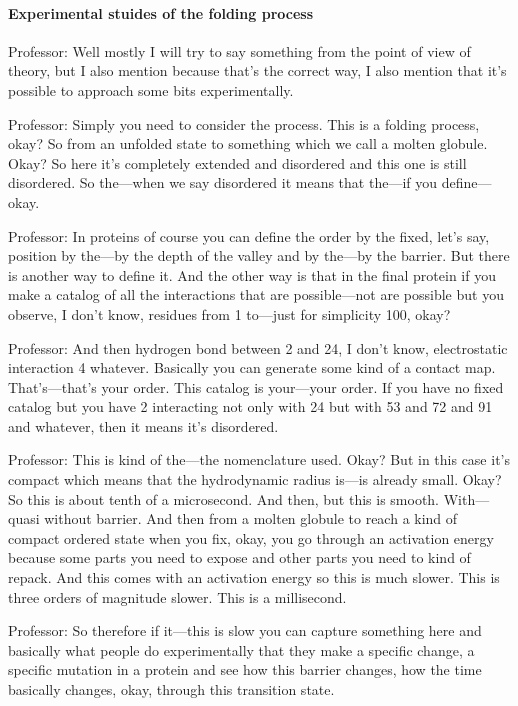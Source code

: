 \paragraph{Experimental stuides of the folding process}
Professor: Well mostly I will try to say something from the point of view of theory, but I also mention because that’s the correct way, I also mention that it’s possible to approach some bits experimentally.

Professor: Simply you need to consider the process. This is a folding process, okay? So from an unfolded state to something which we call a molten globule. Okay? So here it’s completely extended and disordered and this one is still disordered. So the—when we say disordered it means that the—if you define—okay.

Professor: In proteins of course you can define the order by the fixed, let’s say, position by the—by the depth of the valley and by the—by the barrier. But there is another way to define it. And the other way is that in the final protein if you make a catalog of all the interactions that are possible—not are possible but you observe, I don’t know, residues from 1 to—just for simplicity 100, okay?

Professor: And then hydrogen bond between 2 and 24, I don’t know, electrostatic interaction 4 whatever. Basically you can generate some kind of a contact map. That’s—that’s your order. This catalog is your—your order. If you have no fixed catalog but you have 2 interacting not only with 24 but with 53 and 72 and 91 and whatever, then it means it’s disordered.

Professor: This is kind of the—the nomenclature used. Okay? But in this case it’s compact which means that the hydrodynamic radius is—is already small. Okay? So this is about tenth of a microsecond. And then, but this is smooth. With—quasi without barrier. And then from a molten globule to reach a kind of compact ordered state when you fix, okay, you go through an activation energy because some parts you need to expose and other parts you need to kind of repack. And this comes with an activation energy so this is much slower. This is three orders of magnitude slower. This is a millisecond.

Professor: So therefore if it—this is slow you can capture something here and basically what people do experimentally that they make a specific change, a specific mutation in a protein and see how this barrier changes, how the time basically changes, okay, through this transition state.

